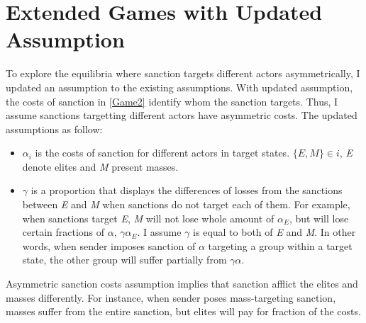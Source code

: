 \documentclass[11pt]{article}
\begin{document}





\appendix
\newpage
\setcounter{figure}{0}
\setcounter{table}{0}
\setcounter{section}{0}
\renewcommand{\thesection}{\Roman{section}}
\renewcommand{\thefigure}{A.\arabic{figure}}
\renewcommand{\thetable}{A.\arabic{table}}
\renewcommand{\thepage}{A.\arabic{page}}
\setcounter{page}{0} 

\clearpage
\section*{Extended Games with Updated Assumption}

To explore the equilibria where sanction targets different actors asymmetrically, I updated an assumption to the existing assumptions. With updated assumption, the costs of sanction in \ref{Game2} identify whom the sanction targets. Thus, I assume sanctions targetting different actors have asymmetric costs. The updated assumptions as follow:

\begin{itemize}
  \item $\alpha_{i}$ is the costs of sanction for different actors in target states. $\{E, M\} \in i$, \textit{E} denote elites and \textit{M} present masses.
	\item $\gamma$ is a proportion that displays the differences of losses from the sanctions between \textit{E} and \textit{M} when sanctions do not target each of them. For example, when sanctions target \textit{E}, \textit{M} will not lose whole amount of $\alpha_{E}$, but will lose certain fractions of $\alpha$, $\gamma\alpha_{E}$. I assume $\gamma$ is equal to both of \textit{E} and \textit{M}. In other words, when sender imposes sanction of $\alpha$ targeting a group within a target state, the other group will suffer partially from $\gamma\alpha$.
\end{itemize}

Asymmetric sanction costs assumption implies that sanction afflict the elites and masses differently. For instance, when sender poses mass-targeting sanction, masses suffer from the entire sanction, but elites will pay for fraction of the costs. 

\begin{center}
	
\end{center}
\end{document}
